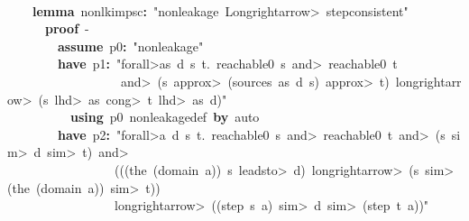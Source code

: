 \documentclass{article}
\newcommand{\syntaxKEYWORDA}[1]{\textcolor[rgb]{0.0,0.4,0.6}{\textbf{#1}}}
\newcommand{\syntaxKEYWORDC}[1]{\textcolor[rgb]{0.0,0.6,1.0}{\textbf{#1}}}
\newcommand{\syntaxLITERALA}[1]{\textcolor[rgb]{1.0,0.0,0.8}{#1}}
\newcommand{\syntaxOPERATOR}[1]{\textcolor[rgb]{0.0,0.0,0.0}{\textbf{#1}}}
\newcommand{\syntaxKEYWORDA}[1]{\textcolor[rgb]{0.0,0.4,0.6}{\textbf{#1}}}
\newcommand{\syntaxKEYWORDC}[1]{\textcolor[rgb]{0.0,0.6,1.0}{\textbf{#1}}}
\newcommand{\syntaxLITERALA}[1]{\textcolor[rgb]{1.0,0.0,0.8}{#1}}
\newcommand{\syntaxOPERATOR}[1]{\textcolor[rgb]{0.0,0.0,0.0}{\textbf{#1}}}
\newcommand{\syntaxKEYWORDA}[1]{\textcolor[rgb]{0.0,0.4,0.6}{\textbf{#1}}}
\newcommand{\syntaxKEYWORDC}[1]{\textcolor[rgb]{0.0,0.6,1.0}{\textbf{#1}}}
\newcommand{\syntaxLITERALA}[1]{\textcolor[rgb]{1.0,0.0,0.8}{#1}}
\newcommand{\syntaxOPERATOR}[1]{\textcolor[rgb]{0.0,0.0,0.0}{\textbf{#1}}}
\newcommand{\syntaxKEYWORDA}[1]{\textcolor[rgb]{0.0,0.4,0.6}{#1}}
\newcommand{\syntaxKEYWORDC}[1]{\textcolor[rgb]{0.0,0.6,1.0}{#1}}
\newcommand{\syntaxLITERALA}[1]{\textcolor[rgb]{1.0,0.0,0.8}{\textbf{#1}}}
\newcommand{\syntaxOPERATOR}[1]{\textcolor[rgb]{0.0,0.0,0.0}{#1}}
\newcommand{\syntaxKEYWORDA}[1]{\textcolor[rgb]{0.0,0.4,0.6}{\textbf{#1}}}
\newcommand{\syntaxKEYWORDC}[1]{\textcolor[rgb]{0.0,0.6,1.0}{\textbf{#1}}}
\newcommand{\syntaxLITERALA}[1]{\textcolor[rgb]{1.0,0.0,0.8}{#1}}
\newcommand{\syntaxOPERATOR}[1]{\textcolor[rgb]{0.0,0.0,0.0}{\textbf{#1}}}
\newcommand{\syntaxKEYWORDA}[1]{\textcolor[rgb]{0.0,0.4,0.6}{\textbf{#1}}}
\newcommand{\syntaxKEYWORDC}[1]{\textcolor[rgb]{0.0,0.6,1.0}{\textbf{#1}}}
\newcommand{\syntaxLITERALA}[1]{\textcolor[rgb]{1.0,0.0,0.8}{#1}}
\newcommand{\syntaxOPERATOR}[1]{\textcolor[rgb]{0.0,0.0,0.0}{\textbf{#1}}}
\begin{document}
\hspace*{\fill}\\
{\ }{\ }{\ }{\ }\syntaxKEYWORDA{lemma}{\ }nonlk\usebox{\underscorebox}imp\usebox{\underscorebox}sc\syntaxOPERATOR{:}{\ }\syntaxLITERALA{"nonleakage{\ }\<Longrightarrow>{\ }step\usebox{\underscorebox}consistent"}{\ }\hspace*{\fill}\\
{\ }{\ }{\ }{\ }{\ }{\ }\syntaxKEYWORDA{proof}{\ }{-}\hspace*{\fill}\\
{\ }{\ }{\ }{\ }{\ }{\ }{\ }{\ }\syntaxKEYWORDC{assume}{\ }p0\syntaxOPERATOR{:}{\ }\syntaxLITERALA{"nonleakage"}\hspace*{\fill}\\
{\ }{\ }{\ }{\ }{\ }{\ }{\ }{\ }\syntaxKEYWORDA{have}{\ }p1\syntaxOPERATOR{:}{\ }\syntaxLITERALA{"\<forall>as{\ }d{\ }s{\ }t.{\ }reachable0{\ }s{\ }\<and>{\ }reachable0{\ }t}\hspace*{\fill}\\
\syntaxLITERALA{{\ }{\ }{\ }{\ }{\ }{\ }{\ }{\ }{\ }{\ }{\ }{\ }{\ }{\ }{\ }{\ }{\ }{\ }\<and>{\ }(s{\ }\<approx>{\ }(sources{\ }as{\ }d{\ }s){\ }\<approx>{\ }t){\ }\<longrightarrow>{\ }(s{\ }\<lhd>{\ }as{\ }\<cong>{\ }t{\ }\<lhd>{\ }as{\ }\usebox{\atbox}{\ }d)"}\hspace*{\fill}\\
{\ }{\ }{\ }{\ }{\ }{\ }{\ }{\ }{\ }{\ }\syntaxKEYWORDA{using}{\ }p0{\ }nonleakage\usebox{\underscorebox}def{\ }\syntaxKEYWORDA{by}{\ }auto{\ }{\ }{\ }{\ }{\ }{\ }{\ }{\ }{\ }{\ }{\ }\hspace*{\fill}\\
{\ }{\ }{\ }{\ }{\ }{\ }{\ }{\ }\syntaxKEYWORDA{have}{\ }p2\syntaxOPERATOR{:}{\ }\syntaxLITERALA{"\<forall>a{\ }d{\ }s{\ }t.{\ }reachable0{\ }s{\ }\<and>{\ }reachable0{\ }t{\ }\<and>{\ }(s{\ }\<sim>{\ }d{\ }\<sim>{\ }t){\ }\<and>{\ }}\hspace*{\fill}\\
\syntaxLITERALA{{\ }{\ }{\ }{\ }{\ }{\ }{\ }{\ }{\ }{\ }{\ }{\ }{\ }{\ }{\ }{\ }{\ }(((the{\ }(domain{\ }a)){\ }\usebox{\atbox}{\ }s{\ }\<leadsto>{\ }d){\ }\<longrightarrow>{\ }(s{\ }\<sim>{\ }(the{\ }(domain{\ }a)){\ }\<sim>{\ }t))}\hspace*{\fill}\\
\syntaxLITERALA{{\ }{\ }{\ }{\ }{\ }{\ }{\ }{\ }{\ }{\ }{\ }{\ }{\ }{\ }{\ }{\ }{\ }\<longrightarrow>{\ }((step{\ }s{\ }a){\ }\<sim>{\ }d{\ }\<sim>{\ }(step{\ }t{\ }a))"}\hspace*{\fill}\\
\end{document}
